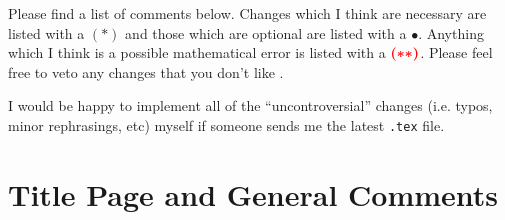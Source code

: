 \documentclass[11 pt]{article}
\begin{document}
\maketitle

Please find a list of comments below. Changes which I think are necessary are listed with a $\boldsymbol{(*)}$ and those which are optional are listed with a $\bullet$. Anything which I think is a possible mathematical error is listed with a $\color{red}{\boldsymbol{(**)}}$. Please feel free to veto any changes that you don't like \smiley{}.

\begin{rem}
I would be happy to implement all of the ``uncontroversial'' changes (i.e. typos, minor rephrasings, etc) myself if someone sends me the latest \texttt{.tex} file.  
\end{rem}

\addtocounter{section}{-1}
\section{Title Page and General Comments}
\end{document}
